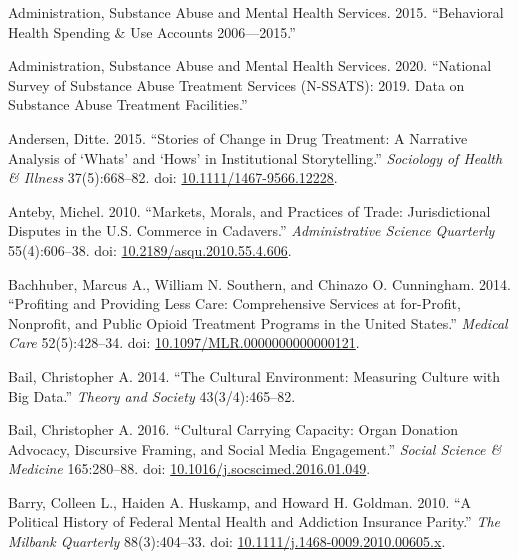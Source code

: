 \documentclass[
  12pt,
]{article}
\begin{document}
\leavevmode\hypertarget{ref-substanceabuseandmentalhealthservicesadministration2015}{}%
Administration, Substance Abuse and Mental Health Services. 2015. ``Behavioral Health Spending \& Use Accounts 2006---2015.''

\leavevmode\hypertarget{ref-substanceabuseandmentalhealthservicesadministration2020}{}%
Administration, Substance Abuse and Mental Health Services. 2020. ``National Survey of Substance Abuse Treatment Services (N-SSATS): 2019. Data on Substance Abuse Treatment Facilities.''

\leavevmode\hypertarget{ref-andersen2015}{}%
Andersen, Ditte. 2015. ``Stories of Change in Drug Treatment: A Narrative Analysis of `Whats' and `Hows' in Institutional Storytelling.'' \emph{Sociology of Health \& Illness} 37(5):668--82. doi: \href{https://doi.org/10.1111/1467-9566.12228}{10.1111/1467-9566.12228}.

\leavevmode\hypertarget{ref-anteby2010}{}%
Anteby, Michel. 2010. ``Markets, Morals, and Practices of Trade: Jurisdictional Disputes in the U.S. Commerce in Cadavers.'' \emph{Administrative Science Quarterly} 55(4):606--38. doi: \href{https://doi.org/10.2189/asqu.2010.55.4.606}{10.2189/asqu.2010.55.4.606}.

\leavevmode\hypertarget{ref-bachhuber2014}{}%
Bachhuber, Marcus A., William N. Southern, and Chinazo O. Cunningham. 2014. ``Profiting and Providing Less Care: Comprehensive Services at for-Profit, Nonprofit, and Public Opioid Treatment Programs in the United States.'' \emph{Medical Care} 52(5):428--34. doi: \href{https://doi.org/10.1097/MLR.0000000000000121}{10.1097/MLR.0000000000000121}.

\leavevmode\hypertarget{ref-bail2014}{}%
Bail, Christopher A. 2014. ``The Cultural Environment: Measuring Culture with Big Data.'' \emph{Theory and Society} 43(3/4):465--82.

\leavevmode\hypertarget{ref-bail2016}{}%
Bail, Christopher A. 2016. ``Cultural Carrying Capacity: Organ Donation Advocacy, Discursive Framing, and Social Media Engagement.'' \emph{Social Science \& Medicine} 165:280--88. doi: \href{https://doi.org/10.1016/j.socscimed.2016.01.049}{10.1016/j.socscimed.2016.01.049}.

\leavevmode\hypertarget{ref-barry2010}{}%
Barry, Colleen L., Haiden A. Huskamp, and Howard H. Goldman. 2010. ``A Political History of Federal Mental Health and Addiction Insurance Parity.'' \emph{The Milbank Quarterly} 88(3):404--33. doi: \href{https://doi.org/10.1111/j.1468-0009.2010.00605.x}{10.1111/j.1468-0009.2010.00605.x}.
\end{document}

